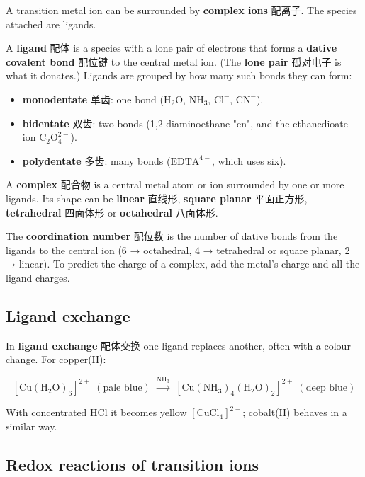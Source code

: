 \documentclass[11pt]{article}
\begin{document}
A transition metal ion can be surrounded by \textbf{complex ions} 配离子. The species attached are ligands.

A \textbf{ligand} 配体 is a species with a lone pair of electrons that forms a \textbf{dative covalent bond} 配位键 to the central metal ion. (The \textbf{lone pair} 孤对电子 is what it donates.) Ligands are grouped by how many such bonds they can form:

\begin{itemize}
\item \textbf{monodentate} 单齿: one bond ($\text{H}_2\text{O}$, $\text{NH}_3$, $\text{Cl}^-$, $\text{CN}^-$).

\item \textbf{bidentate} 双齿: two bonds (1,2-diaminoethane "en", and the ethanedioate ion $\text{C}_2\text{O}_4^{2-}$).

\item \textbf{polydentate} 多齿: many bonds ($\text{EDTA}^{4-}$, which uses six).

\end{itemize}

A \textbf{complex} 配合物 is a central metal atom or ion surrounded by one or more ligands. Its shape can be \textbf{linear} 直线形, \textbf{square planar} 平面正方形, \textbf{tetrahedral} 四面体形 or \textbf{octahedral} 八面体形.

The \textbf{coordination number} 配位数 is the number of dative bonds from the ligands to the central ion (6 → octahedral, 4 → tetrahedral or square planar, 2 → linear). To predict the charge of a complex, add the metal's charge and all the ligand charges.

\subsection*{Ligand exchange}

In \textbf{ligand exchange} 配体交换 one ligand replaces another, often with a colour change. For copper(II):

\[
[\text{Cu}(\text{H}_2\text{O})_6]^{2+} \;(\text{pale blue}) \;\xrightarrow{\text{NH}_3}\; [\text{Cu}(\text{NH}_3)_4(\text{H}_2\text{O})_2]^{2+} \;(\text{deep blue})
\]

With concentrated $\text{HCl}$ it becomes yellow $[\text{CuCl}_4]^{2-}$; cobalt(II) behaves in a similar way.

\subsection*{Redox reactions of transition ions}
\end{document}
